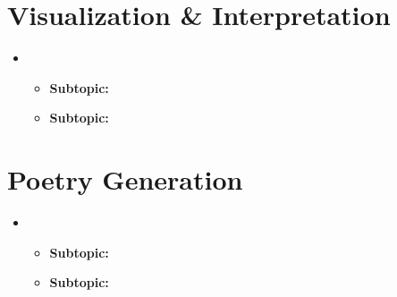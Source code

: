 \section{Visualization \& Interpretation}
\medskip
\begin{itemize}

    \item {}

    \begin{itemize}
    \item \textbf{Subtopic:}
    \item \textbf{Subtopic:}
    \end{itemize}

\end{itemize}


\section{Poetry Generation}
\medskip
\begin{itemize}

    \item {}

    \begin{itemize}
    \item \textbf{Subtopic:}
    \item \textbf{Subtopic:}
    \end{itemize}


\end{itemize}







